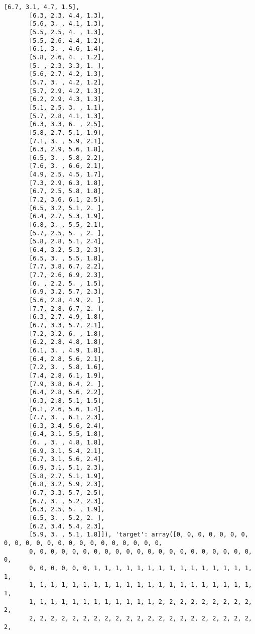 \documentclass[11pt]{article}
\begin{document}
\begin{Verbatim}[commandchars=\\\{\}]
       [6.7, 3.1, 4.7, 1.5],
       [6.3, 2.3, 4.4, 1.3],
       [5.6, 3. , 4.1, 1.3],
       [5.5, 2.5, 4. , 1.3],
       [5.5, 2.6, 4.4, 1.2],
       [6.1, 3. , 4.6, 1.4],
       [5.8, 2.6, 4. , 1.2],
       [5. , 2.3, 3.3, 1. ],
       [5.6, 2.7, 4.2, 1.3],
       [5.7, 3. , 4.2, 1.2],
       [5.7, 2.9, 4.2, 1.3],
       [6.2, 2.9, 4.3, 1.3],
       [5.1, 2.5, 3. , 1.1],
       [5.7, 2.8, 4.1, 1.3],
       [6.3, 3.3, 6. , 2.5],
       [5.8, 2.7, 5.1, 1.9],
       [7.1, 3. , 5.9, 2.1],
       [6.3, 2.9, 5.6, 1.8],
       [6.5, 3. , 5.8, 2.2],
       [7.6, 3. , 6.6, 2.1],
       [4.9, 2.5, 4.5, 1.7],
       [7.3, 2.9, 6.3, 1.8],
       [6.7, 2.5, 5.8, 1.8],
       [7.2, 3.6, 6.1, 2.5],
       [6.5, 3.2, 5.1, 2. ],
       [6.4, 2.7, 5.3, 1.9],
       [6.8, 3. , 5.5, 2.1],
       [5.7, 2.5, 5. , 2. ],
       [5.8, 2.8, 5.1, 2.4],
       [6.4, 3.2, 5.3, 2.3],
       [6.5, 3. , 5.5, 1.8],
       [7.7, 3.8, 6.7, 2.2],
       [7.7, 2.6, 6.9, 2.3],
       [6. , 2.2, 5. , 1.5],
       [6.9, 3.2, 5.7, 2.3],
       [5.6, 2.8, 4.9, 2. ],
       [7.7, 2.8, 6.7, 2. ],
       [6.3, 2.7, 4.9, 1.8],
       [6.7, 3.3, 5.7, 2.1],
       [7.2, 3.2, 6. , 1.8],
       [6.2, 2.8, 4.8, 1.8],
       [6.1, 3. , 4.9, 1.8],
       [6.4, 2.8, 5.6, 2.1],
       [7.2, 3. , 5.8, 1.6],
       [7.4, 2.8, 6.1, 1.9],
       [7.9, 3.8, 6.4, 2. ],
       [6.4, 2.8, 5.6, 2.2],
       [6.3, 2.8, 5.1, 1.5],
       [6.1, 2.6, 5.6, 1.4],
       [7.7, 3. , 6.1, 2.3],
       [6.3, 3.4, 5.6, 2.4],
       [6.4, 3.1, 5.5, 1.8],
       [6. , 3. , 4.8, 1.8],
       [6.9, 3.1, 5.4, 2.1],
       [6.7, 3.1, 5.6, 2.4],
       [6.9, 3.1, 5.1, 2.3],
       [5.8, 2.7, 5.1, 1.9],
       [6.8, 3.2, 5.9, 2.3],
       [6.7, 3.3, 5.7, 2.5],
       [6.7, 3. , 5.2, 2.3],
       [6.3, 2.5, 5. , 1.9],
       [6.5, 3. , 5.2, 2. ],
       [6.2, 3.4, 5.4, 2.3],
       [5.9, 3. , 5.1, 1.8]]), 'target': array([0, 0, 0, 0, 0, 0, 0, 0, 0, 0, 0, 0, 0, 0, 0, 0, 0, 0, 0, 0, 0, 0,
       0, 0, 0, 0, 0, 0, 0, 0, 0, 0, 0, 0, 0, 0, 0, 0, 0, 0, 0, 0, 0, 0,
       0, 0, 0, 0, 0, 0, 1, 1, 1, 1, 1, 1, 1, 1, 1, 1, 1, 1, 1, 1, 1, 1,
       1, 1, 1, 1, 1, 1, 1, 1, 1, 1, 1, 1, 1, 1, 1, 1, 1, 1, 1, 1, 1, 1,
       1, 1, 1, 1, 1, 1, 1, 1, 1, 1, 1, 1, 2, 2, 2, 2, 2, 2, 2, 2, 2, 2,
       2, 2, 2, 2, 2, 2, 2, 2, 2, 2, 2, 2, 2, 2, 2, 2, 2, 2, 2, 2, 2, 2,

\end{Verbatim}
\end{document}
